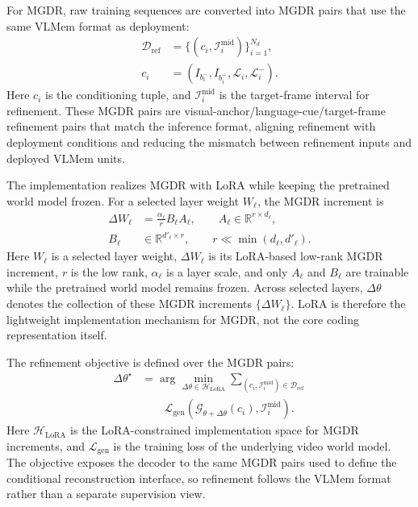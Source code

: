 For MGDR, raw training sequences are converted into MGDR pairs that use the same VLMem format as deployment:
\begin{equation}
\begin{aligned}
\mathcal{D}_{\mathrm{ref}}
&=\{(c_i,\mathcal{I}_{i}^{\mathrm{mid}})\}_{i=1}^{N_d},\\
c_i
&=\left(I_{b_i^-},I_{b_i^+},
\mathcal{L}_i,\mathcal{L}_i^{-}\right).
\end{aligned}
\label{eq:refinement_pairs}
\end{equation}
Here \(c_i\) is the conditioning tuple, and \(\mathcal{I}_{i}^{\mathrm{mid}}\) is the target-frame interval for refinement. These MGDR pairs are visual-anchor/language-cue/target-frame refinement pairs that match the inference format, aligning refinement with deployment conditions and reducing the mismatch between refinement inputs and deployed VLMem units.

The implementation realizes MGDR with LoRA while keeping the pretrained world model frozen. For a selected layer weight \(W_{\ell}\), the MGDR increment is
\begin{equation}
\begin{aligned}
\Delta W_{\ell}
&=\frac{\alpha_{\ell}}{r}B_{\ell}A_{\ell},\qquad
A_{\ell}\in\mathbb{R}^{r\times d_{\ell}},\\
B_{\ell}&\in\mathbb{R}^{d'_{\ell}\times r},\qquad
r\ll\min(d_{\ell},d'_{\ell}).
\end{aligned}
\label{eq:lora_refinement_space}
\end{equation}
Here \(W_\ell\) is a selected layer weight, \(\Delta W_{\ell}\) is its LoRA-based low-rank MGDR increment, \(r\) is the low rank, \(\alpha_{\ell}\) is a layer scale, and only \(A_{\ell}\) and \(B_{\ell}\) are trainable while the pretrained world model remains frozen. Across selected layers, \(\Delta\theta\) denotes the collection of these MGDR increments \(\{\Delta W_\ell\}\). LoRA is therefore the lightweight implementation mechanism for MGDR, not the core coding representation itself.

The refinement objective is defined over the MGDR pairs:
\begin{equation}
\begin{aligned}
\Delta\theta^{\star}
&=
\arg\min_{\Delta\theta\in\mathcal{H}_{\mathrm{LoRA}}}
\sum_{(c_i,\mathcal{I}_{i}^{\mathrm{mid}})\in\mathcal{D}_{\mathrm{ref}}}\\
&\qquad
\mathcal{L}_{\mathrm{gen}}\!\left(
\mathcal{G}_{\theta+\Delta\theta}(c_i),
\mathcal{I}_{i}^{\mathrm{mid}}\right).
\end{aligned}
\label{eq:memory_guided_refinement}
\end{equation}
Here \(\mathcal{H}_{\mathrm{LoRA}}\) is the LoRA-constrained implementation space for MGDR increments, and \(\mathcal{L}_{\mathrm{gen}}\) is the training loss of the underlying video world model. The objective exposes the decoder to the same MGDR pairs used to define the conditional reconstruction interface, so refinement follows the VLMem format rather than a separate supervision view.

